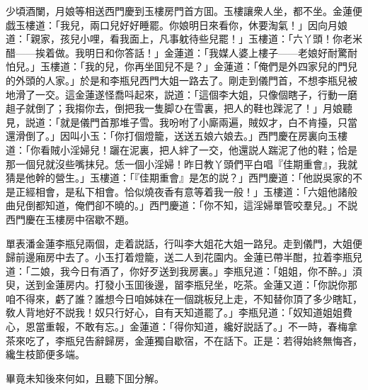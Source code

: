少頃酒闌，月娘等相送西門慶到玉樓房門首方囬。玉樓讓衆人坐，都不坐。金蓮便戯玉樓道：「我兒，兩口兒好好睡罷。你娘明日來看你，休要淘氣！」因向月娘道：「親家，孩兒小哩，看我面上，凡事躭待些兒罷！」玉樓道：「六丫頭！你老米醋——挨着做。我明日和你答話！」金蓮道：「我媒人婆上樓子——老娘好耐驚耐怕兒。」玉樓道：「我的兒，你再坐囬兒不是？」金蓮道：「俺們是外四家兒的門兒的外頭的人家。」於是和李瓶兒西門大姐一路去了。剛走到儀門首，不想李瓶兒被地滑了一交。這金蓮遂怪喬呌起來，説道：「這個李大姐，只像個瞎子，行動一磨趄子就倒了；我搊你去，倒把我一隻脚ひ在雪裏，把人的鞋也䠕泥了！」月娘聽見，説道：「就是儀門首那堆子雪。我吩咐了小廝兩遍，賊奴才，白不肯擡，只當還滑倒了。」因叫小玉：「你打個燈籠，送送五娘六娘去。」西門慶在房裏向玉樓道：「你看賊小淫婦兒！躧在泥裏，把人絆了一交，他還説人踹泥了他的鞋；恰是那一個兒就沒些嘴抹兒。恁一個小淫婦！昨日教丫頭們平白唱『佳期重會』，我就猜是他幹的營生。」玉樓道：「『佳期重會』是怎的説？」西門慶道：「他説吳家的不是正經相會，是私下相會。恰似燒夜香有意等着我一般！」玉樓道：「六姐他諸般曲兒倒都知道，俺們卻不曉的。」西門慶道：「你不知，這淫婦單管咬羣兒。」不説西門慶在玉樓房中宿歇不題。

單表潘金蓮李瓶兒兩個，走着説話，行叫李大姐花大姐一路兒。走到儀門，大姐便歸前邊廂房中去了。小玉打着燈籠，送二人到花園内。金蓮已帶半酣，拉着李瓶兒道：「二娘，我今日有酒了，你好歹送到我房裏。」李瓶兒道：「姐姐，你不醉。」湏臾，送到金蓮房内。打發小玉囬後邊，㽞李瓶兒坐，吃茶。金蓮又道：「你説你那咱不得來，虧了誰？誰想今日咱姊妹在一個跳板兒上走，不知替你頂了多少瞎缸，敎人背地好不説我！奴只行好心，自有天知道罷了。」李瓶兒道：「奴知道姐姐費心，恩當重報，不敢有忘。」金蓮道：「得你知道，纔好説話了。」不一時，春梅拿茶來吃了，李瓶兒告辭歸房，金蓮獨自歇宿，不在話下。正是：若得始終無悔吝，纔生枝節便多端。

畢竟未知後來何如，且聽下囬分解。

